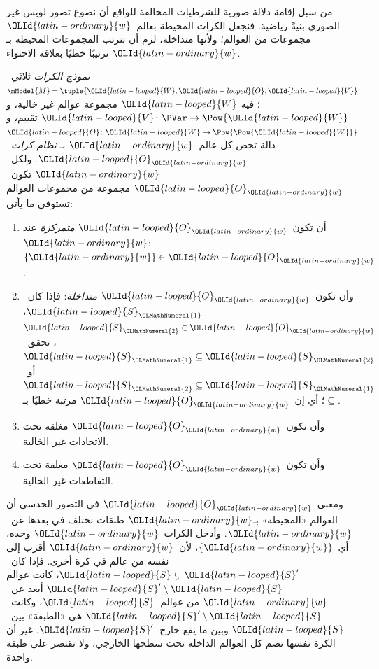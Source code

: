 \documentclass[../../../include/open-logic-section]{subfiles}
\begin{document}


من سبل إقامة دلالة صورية للشرطيات المخالفة للواقع أن نصوغ تصور لويس
غير الصوري بنيةً رياضية. فنجعل الكرات المحيطة بعالم~${\OLId{latin-ordinary}{w}}$ مجموعات من
العوالم؛ ولأنها متداخلة، لزم أن تترتب المجموعات المحيطة بـ${\OLId{latin-ordinary}{w}}$ ترتيبًا
خطيًا بعلاقة الاحتواء.

\begin{defn}
  \emph{نموذج الكرات} ثلاثي~$\mModel{M} = \tuple{{\OLId{latin-looped}{W}}, {\OLId{latin-looped}{O}}, {\OLId{latin-looped}{V}}}$؛ فيه
  ${\OLId{latin-looped}{W}}$ مجموعة عوالم غير خالية، و${\OLId{latin-looped}{V}}\colon \PVar \to \Pow{{\OLId{latin-looped}{W}}}$ تقييم،
  و${\OLId{latin-looped}{O}}\colon {\OLId{latin-looped}{W}} \to \Pow{\Pow{{\OLId{latin-looped}{W}}}}$ دالة تخص كل عالم~${\OLId{latin-ordinary}{w}}$ بـ
  \emph{نظام كرات}~${\OLId{latin-looped}{O}}_{\OLId{latin-ordinary}{w}}$. ولكل~${\OLId{latin-ordinary}{w}}$ تكون~${\OLId{latin-looped}{O}}_{\OLId{latin-ordinary}{w}}$ مجموعة من مجموعات
  العوالم تستوفي ما يأتي:
  \begin{enumerate}
  \item أن تكون~${\OLId{latin-looped}{O}}_{\OLId{latin-ordinary}{w}}$ \emph{متمركزة} عند~${\OLId{latin-ordinary}{w}}$: $\{{\OLId{latin-ordinary}{w}}\} \in {\OLId{latin-looped}{O}}_{\OLId{latin-ordinary}{w}}$.
  \item وأن تكون~${\OLId{latin-looped}{O}}_{\OLId{latin-ordinary}{w}}$ \emph{متداخلة}: فإذا كان~${\OLId{latin-looped}{S}}_{\OLMathNumeral{1}}$، ${\OLId{latin-looped}{S}}_{\OLMathNumeral{2}} \in {\OLId{latin-looped}{O}}_{\OLId{latin-ordinary}{w}}$،
    تحقق~${\OLId{latin-looped}{S}}_{\OLMathNumeral{1}} \subseteq {\OLId{latin-looped}{S}}_{\OLMathNumeral{2}}$ أو~${\OLId{latin-looped}{S}}_{\OLMathNumeral{2}} \subseteq {\OLId{latin-looped}{S}}_{\OLMathNumeral{1}}$؛ أي إن~${\OLId{latin-looped}{O}}_{\OLId{latin-ordinary}{w}}$
    مرتبة خطيًا بـ$\subseteq$.
  \item وأن تكون~${\OLId{latin-looped}{O}}_{\OLId{latin-ordinary}{w}}$ مغلقة تحت الاتحادات غير الخالية.
  \item وأن تكون~${\OLId{latin-looped}{O}}_{\OLId{latin-ordinary}{w}}$ مغلقة تحت التقاطعات غير الخالية.
  \end{enumerate}
\end{defn}

ومعنى~${\OLId{latin-looped}{O}}_{\OLId{latin-ordinary}{w}}$ في التصور الحدسي أن العوالم «المحيطة» بـ${\OLId{latin-ordinary}{w}}$ طبقات تختلف
في بعدها عن~${\OLId{latin-ordinary}{w}}$. وأدخل الكرات~${\OLId{latin-ordinary}{w}}$ وحده، أي~$\{{\OLId{latin-ordinary}{w}}\}$، لأن~${\OLId{latin-ordinary}{w}}$ أقرب إلى
نفسه من عالم في كرة أخرى. فإذا كان~${\OLId{latin-looped}{S}} \subsetneq {\OLId{latin-looped}{S}}'$، كانت عوالم
${\OLId{latin-looped}{S}}' \setminus {\OLId{latin-looped}{S}}$ أبعد عن~${\OLId{latin-ordinary}{w}}$ من عوالم~${\OLId{latin-looped}{S}}$، وكانت~${\OLId{latin-looped}{S}}' \setminus {\OLId{latin-looped}{S}}$
هي «الطبقة» بين~${\OLId{latin-looped}{S}}$ وبين ما يقع خارج~${\OLId{latin-looped}{S}}'$. غير أن الكرة نفسها تضم كل
العوالم الداخلة تحت سطحها الخارجي، ولا تقتصر على طبقة واحدة.
\end{document}
